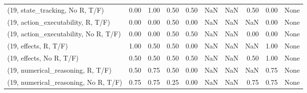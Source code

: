 \begin{table*}[h!]
\begin{adjustbox}{width=2\columnwidth,center}
\begin{tabular}{lrrr|rrr|rrr}
(19, state\_tracking, No R, T/F)       &                      0.00 &                  1.00 &                      0.50 &                          0.50 &                       NaN &                           NaN &                                   0.50 &                               0.00 &                                  None \\
(19, action\_executability, R, T/F)    &                      0.00 &                  0.00 &                      0.50 &                          0.00 &                       NaN &                           NaN &                                    NaN &                               0.00 &                                  None \\
(19, action\_executability, No R, T/F) &                      0.00 &                  0.00 &                      0.50 &                          0.50 &                       NaN &                           NaN &                                   0.00 &                               0.00 &                                  None \\
(19, effects, R, T/F)                 &                      1.00 &                  0.50 &                      0.50 &                          0.00 &                       NaN &                           NaN &                                    NaN &                               1.00 &                                  None \\
(19, effects, No R, T/F)              &                      0.50 &                  0.50 &                      0.50 &                          0.50 &                       NaN &                           NaN &                                   0.50 &                               1.00 &                                  None \\
(19, numerical\_reasoning, R, T/F)     &                      0.50 &                  0.75 &                      0.50 &                          0.00 &                       NaN &                           NaN &                                    NaN &                               0.75 &                                  None \\
(19, numerical\_reasoning, No R, T/F)  &                      0.75 &                  0.75 &                      0.25 &                          0.00 &                       NaN &                           NaN &                                   0.75 &                               0.75 &                                  None \\

\end{tabular}
\end{adjustbox}
\end{table*}
